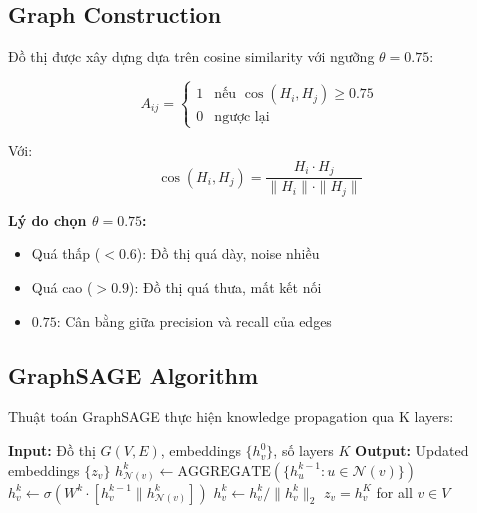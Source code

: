 \documentclass[12pt,a4paper]{article}
\begin{document}
\subsection{Graph Construction}

Đồ thị được xây dựng dựa trên cosine similarity với ngưỡng $\theta = 0.75$:

\begin{equation}
A_{ij} = \begin{cases}
1 & \text{nếu } \cos(H_i, H_j) \geq 0.75 \\
0 & \text{ngược lại}
\end{cases}
\label{eq:graph_adj}
\end{equation}

Với:
\begin{equation}
\cos(H_i, H_j) = \frac{H_i \cdot H_j}{\|H_i\| \cdot \|H_j\|}
\end{equation}

\textbf{Lý do chọn $\theta = 0.75$:}
\begin{itemize}
    \item Quá thấp ($<0.6$): Đồ thị quá dày, noise nhiều
    \item Quá cao ($>0.9$): Đồ thị quá thưa, mất kết nối
    \item $0.75$: Cân bằng giữa precision và recall của edges
\end{itemize}

\subsection{GraphSAGE Algorithm}

Thuật toán GraphSAGE thực hiện knowledge propagation qua K layers:

\begin{algorithm}[H]
\caption{GraphSAGE cho CrisisSpot}
\label{alg:graphsage}
\begin{algorithmic}[1]
\STATE \textbf{Input:} Đồ thị $G(V, E)$, embeddings $\{h_v^0\}$, số layers $K$
\STATE \textbf{Output:} Updated embeddings $\{z_v\}$
        \STATE $h_{\mathcal{N}(v)}^k \leftarrow \text{AGGREGATE}(\{h_u^{k-1} : u \in \mathcal{N}(v)\})$
        \STATE $h_v^k \leftarrow \sigma(W^k \cdot [h_v^{k-1} \| h_{\mathcal{N}(v)}^k])$
        \STATE $h_v^k \leftarrow h_v^k / \|h_v^k\|_2$ 
    \ENDFOR
\ENDFOR
\RETURN $z_v = h_v^K$ for all $v \in V$
\end{algorithmic}
\end{algorithm}
\end{document}

